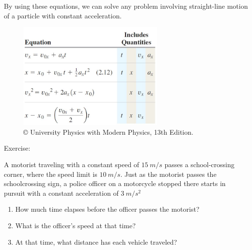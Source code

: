 \documentclass[]{beamer}
\begin{document}
 \begin{frame}
   By using these equations, we can solve any
   problem involving straight-line motion of a particle with constant acceleration.
    \vspace{3mm}
 
    \begin{figure}[h!]
  
       \includegraphics[width=0.65\textwidth]{images/equations1.jpg}
       \caption{ {\tiny © University Physics 
       with Modern Physics, 13th Edition.} }
     \end{figure}
 
 
  \end{frame}
 

  


 \begin{frame}
  Exercise:
  \vspace{3mm}

  A motorist traveling with a constant speed of $15~m/s$ 
passes a school-crossing corner, where the speed limit is $10~m/s$.
 Just as the motorist passes the schoolcrossing
sign, a police officer on a motorcycle stopped there starts
in pursuit with a constant acceleration of $3~m/s^2$

\begin{enumerate}
   \item How much time elapses before the officer passes the motorist?
   \item What is the officer’s speed at that time?
   \item At that time, what distance has each vehicle traveled?
\end{enumerate}

 
 
  \end{frame}
\end{document}
